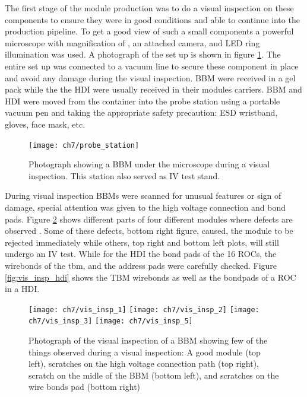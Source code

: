 The first stage of the module production was to do a visual inspection on these components to ensure they were in good conditions and able to continue into the production pipeline. {} To get a good view of such a small components a powerful microscope with magnification of {}, an attached camera, and LED ring illumination was used. A photograph of the set up is shown in figure \ref{fig:probe_station}. The entire set up was connected to a vacuum line to secure these component in place and avoid any damage during the visual inspection. BBM were received in a gel pack while the the HDI were usually received in their modules carriers. BBM and HDI were moved from the container into the probe station using a portable vacuum pen and taking the appropriate safety precaution: ESD wristband, gloves, face mask, etc.

\begin{figure}[!h]
\centering
\texttt{[image: ch7/probe\_station]}
\caption[Photograph of the visual inspection and IV test station.]{{} Photograph showing a BBM under the microscope during a visual inspection. This station also served as IV test stand.}\label{fig:probe_station}
\end{figure}

During visual inspection BBMs were scanned for unusual features or sign of damage, special attention was given to the high voltage connection and bond pads. Figure \ref{fig:vis_insp_bbm} shows different parts of four different modules where defects are observed {}. Some of these defects, bottom right figure, caused, the module to be rejected immediately while others, top right and bottom left plots, will still undergo an IV test. While for the HDI the bond pads of the 16 ROCs, the wirebonds of the tbm, and the address pads were carefully checked. Figure \ref{fig:vis_insp_hdi} shows the TBM wirebonds as well as the bondpads of a ROC in a HDI.

\begin{figure}[!h]
  \centering
  \texttt{[image: ch7/vis\_insp\_1]}
  \texttt{[image: ch7/vis\_insp\_2]}
  \texttt{[image: ch7/vis\_insp\_3]}
  \texttt{[image: ch7/vis\_insp\_5]}
  \caption[Visual inspection of a bare module.]{Photograph of the visual inspection of a BBM showing few of the things observed during a visual inspection: A good module (top left), scratches on the high voltage connection path (top right), scratch on the midle of the BBM (bottom left), and scratches on the wire bonds pad (bottom right)}\label{fig:vis_insp_bbm}
\end{figure}

